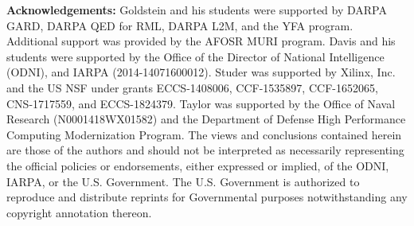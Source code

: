 \documentclass{article}
\begin{document}
\textbf{Acknowledgements:}
Goldstein and his students were supported by DARPA GARD, DARPA QED for RML, DARPA L2M, and the YFA program. Additional support was provided by the AFOSR MURI program. Davis and his students were supported by the Office of the Director of National Intelligence (ODNI), and IARPA (2014-14071600012). Studer was supported by Xilinx, Inc. and the US NSF under grants ECCS-1408006, CCF-1535897,  CCF-1652065, CNS-1717559, and ECCS-1824379.
Taylor was supported by the Office of Naval Research (N0001418WX01582) and the Department of Defense High Performance Computing Modernization Program.  The views and conclusions contained herein are those of the authors and should not be interpreted as necessarily representing the official policies or endorsements, either expressed or implied, of the ODNI, IARPA, or the U.S. Government. The U.S. Government is authorized to reproduce and distribute reprints for Governmental purposes notwithstanding any copyright annotation thereon.




\FloatBarrier

\end{document}
